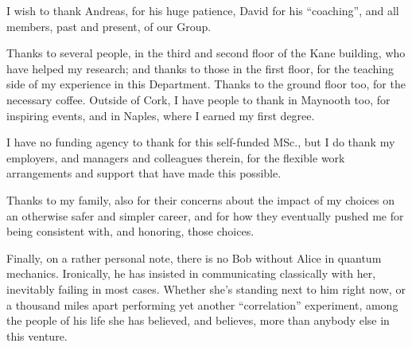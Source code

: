 I wish to thank Andreas, for his huge patience, David for
his ``coaching'',
and all members, past and present, of our Group.

Thanks to several people, in the third and second floor of the Kane building,
who have helped my research; and thanks to those in the first floor,
for the teaching side of my experience in this Department.
Thanks to the ground floor too, for the necessary coffee.
Outside of Cork, I have people to thank in Maynooth too,
for inspiring events,
and in Naples,
where I earned my first degree.

I have no funding agency to thank for this self-funded MSc.,
but I do thank my employers, and managers and colleagues therein,
for the flexible work arrangements and support that have made this possible.

Thanks to my family, also for their concerns about the impact of my choices on an otherwise safer and simpler career,
and for how they eventually pushed me for being consistent with, and honoring, those choices.

Finally, on a rather personal note, there is no Bob without Alice in quantum mechanics.
Ironically, he has insisted in communicating classically with her,
inevitably failing in most cases.
Whether she's standing next to him right now,
or a thousand miles apart performing yet another ``correlation'' experiment,
among the people of his life
she has believed, and believes, more than anybody else in this venture.
